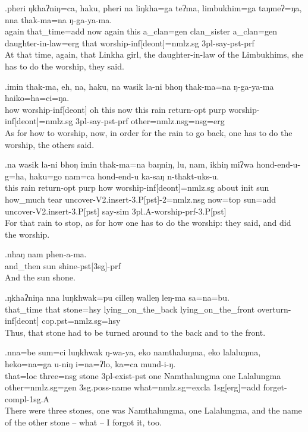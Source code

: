 \exg.pheri ŋkhaʔniŋ=ca,  haku, pheri na liŋkha=ga  teʔma, limbukhim=ga  taŋmeʔ=ŋa, nna  thak-ma=na   ŋ-ga-ya-ma.\\
again that\_time{\sc =add} now again this a\_clan{\sc =gen} clan\_sister a\_clan{\sc =gen} daughter-in-law{\sc =erg} that worship{\sc -inf[deont]=nmlz.sg} {\sc 3pl-}say{\sc -pst-prf}\\
At that time, again, that Linkha girl, the daughter-in-law of the Limbukhims, she has to do the worship, they said.

\exg.imin thak-ma,   eh,  na,  haku, na wasik la-ni  bhoŋ thak-ma=na   ŋ-ga-ya-ma   haiko=ha=ci=ŋa.\\
how  worship{\sc -inf[deont]} oh this now this rain  return{\sc -opt} {\sc purp} worship{\sc -inf[deont]=nmlz.sg} {\sc 3pl-}say{\sc -pst-prf} other{\sc =nmlz.nsg=nsg=erg}\\
As for how to worship, now, in order for the rain to go back, one has to do the worship, the others said.

\exg.na wasik la-ni  bhoŋ imin thak-ma=na   baŋniŋ, lu, nam, ikhiŋ miʔwa hond-end-u-g=ha,    haku=go nam=ca  hond-end-u    ka-saŋ n-thakt-uks-u.\\
this rain  return{\sc -opt} purp  how  worship{\sc -inf[deont]=nmlz.sg} about  {\sc init} sun  how\_much tear uncover{\sc -V2.insert-3.P[pst]-2=nmlz.nsg} now{\sc =top}  sun{\sc =add} uncover{\sc -V2.insert-3.P[pst]} say{\sc -sim} {\sc 3pl.A-}worship{\sc -prf-3.P[pst]}\\
For that rain to stop, as for how one has to do the worship:  they said, and did the worship.

\exg.nhaŋ  nam phen-a-ma.\\
and\_then sun shine{\sc -pst[3sg]-prf}\\
And the sun shone.

\exg.ŋkhaʔniŋa nna  luŋkhwak=pu cilleŋ   walleŋ  leŋ-ma   sa=na=bu.\\
that\_time  that stone{\sc =hsy}  lying\_on\_the\_back lying\_on\_the\_front overturn{\sc -inf[deont]} {\sc cop.pst=nmlz.sg=hsy}\\
Thus, that stone had to be turned around to the back and to the front. 

\exg.nna=be sum=ci luŋkhwak ŋ-wa-ya,   eko namthaluŋma, eko lalaluŋma, heko=na=ga  u-niŋ  i=na=ʔlo,   ka=ca  mund-i-ŋ.\\
that{\sc =loc} three{\sc =nsg} stone {\sc 3pl-}exist{\sc -pst} one Namthalungma one Lalalungma other{\sc =nmlz.sg=gen} {\sc 3sg.poss-}name what{\sc =nmlz.sg=excla} {\sc 1sg[erg]=add} forget{\sc -compl-1sg.A}\\
There were three stones, one was Namthalungma, one Lalalungma, and the name of the other stone -- what -- I forgot it, too.


